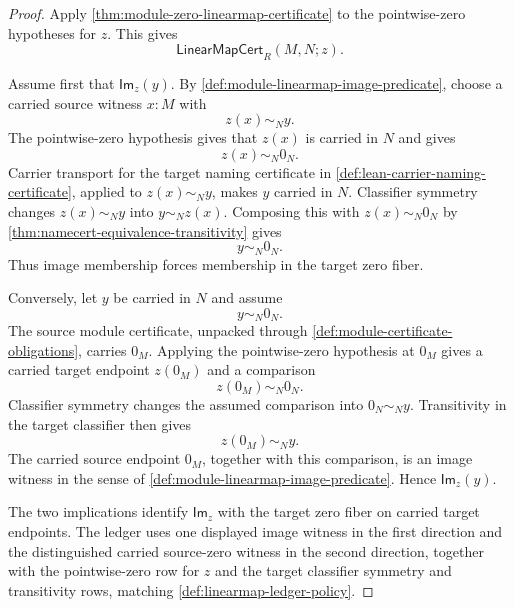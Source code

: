 \begin{proof}
Apply \autoref{thm:module-zero-linearmap-certificate} to the pointwise-zero hypotheses for $z$. This gives
$$
\mathsf{LinearMapCert}_R(M,N;z).
$$

Assume first that $\mathsf{Im}_z(y)$. By \autoref{def:module-linearmap-image-predicate}, choose a carried source witness $x:M$ with
$$
z(x)\sim_Ny.
$$
The pointwise-zero hypothesis gives that $z(x)$ is carried in $N$ and gives
$$
z(x)\sim_N0_N.
$$
Carrier transport for the target naming certificate in \autoref{def:lean-carrier-naming-certificate}, applied to $z(x)\sim_Ny$, makes $y$ carried in $N$. Classifier symmetry changes $z(x)\sim_Ny$ into $y\sim_Nz(x)$. Composing this with $z(x)\sim_N0_N$ by \autoref{thm:namecert-equivalence-transitivity} gives
$$
y\sim_N0_N.
$$
Thus image membership forces membership in the target zero fiber.

Conversely, let $y$ be carried in $N$ and assume
$$
y\sim_N0_N.
$$
The source module certificate, unpacked through \autoref{def:module-certificate-obligations}, carries $0_M$. Applying the pointwise-zero hypothesis at $0_M$ gives a carried target endpoint $z(0_M)$ and a comparison
$$
z(0_M)\sim_N0_N.
$$
Classifier symmetry changes the assumed comparison into $0_N\sim_Ny$. Transitivity in the target classifier then gives
$$
z(0_M)\sim_Ny.
$$
The carried source endpoint $0_M$, together with this comparison, is an image witness in the sense of \autoref{def:module-linearmap-image-predicate}. Hence $\mathsf{Im}_z(y)$.

The two implications identify $\mathsf{Im}_z$ with the target zero fiber on carried target endpoints. The ledger uses one displayed image witness in the first direction and the distinguished carried source-zero witness in the second direction, together with the pointwise-zero row for $z$ and the target classifier symmetry and transitivity rows, matching \autoref{def:linearmap-ledger-policy}.
\end{proof}
